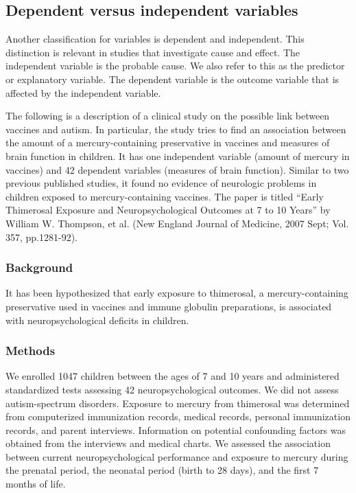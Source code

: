 \documentclass[11pt, chapterprefix=true]{scrbook}\usepackage[]{graphicx}\usepackage[]{color}
\begin{document}
\subsection{Dependent versus independent variables}

Another classification for variables is dependent and independent. This distinction is relevant in studies that investigate cause and effect.  The independent variable is the probable cause.  We also refer to this as the predictor or explanatory variable.  The dependent variable is the outcome variable that is affected by the independent variable.


The following is a description of a clinical study on the possible link between vaccines and autism.   In particular, the study tries to find an association between the amount of a mercury-containing preservative in vaccines and measures of brain function in children.   It has one independent variable (amount of mercury in vaccines) and 42 dependent variables (measures of brain function).  Similar to two previous published studies, it found no evidence of neurologic problems in children exposed to mercury-containing vaccines. The paper is titled ``Early Thimerosal Exposure and Neuropsychological Outcomes at 7 to 10 Years'' by William W. Thompson, et al. (New England Journal of Medicine, 2007 Sept; Vol. 357, pp.1281-92).

\subsubsection{Background}

It has been hypothesized that early exposure to thimerosal, a mercury-containing
preservative used in vaccines and immune globulin preparations, is associated with
neuropsychological deficits in children.

\subsubsection{Methods}

We enrolled 1047 children between the ages of 7 and 10 years and administered standardized tests assessing 42 neuropsychological outcomes. We did not assess autism-spectrum disorders. Exposure to mercury from thimerosal was determined from computerized immunization records, medical records, personal immunization records, and parent interviews. Information on potential confounding factors was obtained from the interviews and medical charts. We assessed the association between current neuropsychological performance and exposure to mercury during the prenatal period, the neonatal period (birth to 28 days), and the first 7 months of
life.
\end{document}
